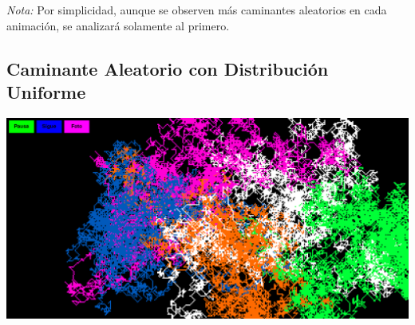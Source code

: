 \documentclass[11pt]{article} %
\begin{document}
	\newpage
	\textit{Nota:} Por simplicidad, aunque se observen más caminantes aleatorios en cada animación, se analizará solamente al primero.
	
	 \subsection{Caminante Aleatorio con Distribución Uniforme}
	 \begin{center}
	 	\includegraphics[width=1\linewidth]{walkerUniforme.png}
	 	\label{walkerUniforme}
	 \end{center}
	 
	
	
\end{document}
